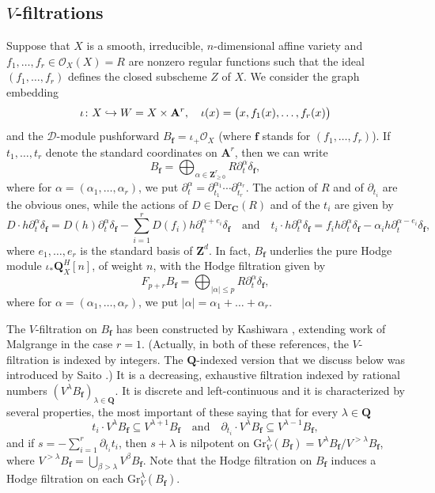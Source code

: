 \documentclass[JEP,XML,SOM,Unicode]{cedram}
\newcommand\hto{\mathrel{\lhook\joinrel\to}}
\theoremstyle{plain}
\theoremstyle{definition}
\newcommand\A{{\mathbf A}}
\newcommand\Z{{\mathbf Z}}
\newcommand\Q{{\mathbf Q}}
\newcommand\C{{\mathbf C}}
\newcommand\cD{\mathcal{D}}
\newcommand\cO{\mathcal{O}}
\newcommand\cO{\mathcal{O}}
\newcommand\bff{{\boldsymbol f}}
\newcommand\gr{\mathrm{Gr}}
\begin{document}
\subsection{$V$-filtrations}\label{section_V_filtration} Suppose that $X$ is a smooth, irreducible, $n$-dimensional affine variety and $f_1,\ldots,f_r\in\cO_X(X)=R$ are nonzero regular functions such that the ideal
$(f_1,\ldots,f_r)$ defines the closed subscheme $Z$ of $X$. We consider the graph embedding
\[\iota\colon X\hto W=X\times\A^r,\quad \iota(x)=\big(x,f_1(x),\ldots,f_r(x)\big)\]
and the $\cD$-module pushforward $B_{\bff}=\iota_+\cO_X$ (where $\bff$ stands for $(f_1,\ldots,f_r)$). If~$t_1,\ldots,t_r$ denote the standard coordinates on
$\A^r$, then we can write
\[B_{\bff}=\bigoplus_{\alpha\in \Z_{\geq 0}^r}R\partial_t^{\alpha}\delta_{\bff},\]
where for $\alpha=(\alpha_1,\ldots,\alpha_r)$, we put $\partial_t^{\alpha}=\partial_{t_1}^{\alpha_1}\cdots \partial_{t_r}^{\alpha_r}$.
The action of $R$ and of $\partial_{t_i}$ are the obvious ones, while the actions of $D\in \mathrm{Der}_{\C}(R)$ and of the $t_i$ are given by
\[D\cdot h\partial_t^{\alpha}\delta_{\bff}=D(h)\partial_t^{\alpha}\delta_{\bff}-\sum_{i=1}^rD(f_i)h\partial_t^{\alpha+e_i}\delta_{\bff}\quad\text{and}\quad
t_i\cdot h\partial_t^{\alpha}\delta_{\bff}=f_ih\partial_t^{\alpha}\delta_{\bff}-\alpha_ih\partial_t^{\alpha-e_i}\delta_{\bff},\]
where $e_1,\ldots,e_r$ is the standard basis of $\Z^d$. In fact, $B_{\bff}$ underlies the pure Hodge module $\iota_*\Q_X^H[n]$, of weight $n$,
with the Hodge filtration given by
\[F_{p+r}B_{\bff}=\bigoplus_{|\alpha|\leq p}R\partial_t^{\alpha}\delta_{\bff},\]
where for $\alpha=(\alpha_1,\ldots,\alpha_r)$, we put $|\alpha|=\alpha_1+\ldots+\alpha_r$.

The $V$-filtration on $B_{\bff}$ has been constructed by Kashiwara \cite{Kashiwara}, extending work of Malgrange \cite{Malgrange} in the case $r=1$.
(Actually, in both of these references, the $V$-filtration is indexed by integers. The $\Q$-indexed version that we discuss below was introduced by Saito \cite{Saito_GM}.)
It is a decreasing, exhaustive filtration indexed by rational numbers $(V^{\lambda}B_{\bff})_{\lambda\in\Q}$. It is discrete and left-continuous and
it is characterized by several properties, the most important of these saying that for every $\lambda\in\Q$
\[t_i\cdot V^{\lambda}B_{\bff}\subseteq V^{\lambda+1}B_{\bff}\quad\text{and}\quad \partial_{t_i}\cdot V^{\lambda}B_{\bff}\subseteq V^{\lambda-1}B_{\bff},\]
and if $s=-\sum_{i=1}^r\partial_{t_i}t_i$, then $s+\lambda$ is nilpotent on $\gr^{\lambda}_V(B_{\bff})=V^{\lambda}B_{\bff}/V^{>\lambda}B_{\bff}$,
where $V^{>\lambda}B_{\bff}=\bigcup_{\beta>\lambda}V^{\beta}B_{\bff}$. Note that the Hodge filtration on $B_{\bff}$ induces a Hodge filtration
on each $\gr_V^{\lambda}(B_{\bff})$.
\end{document}
